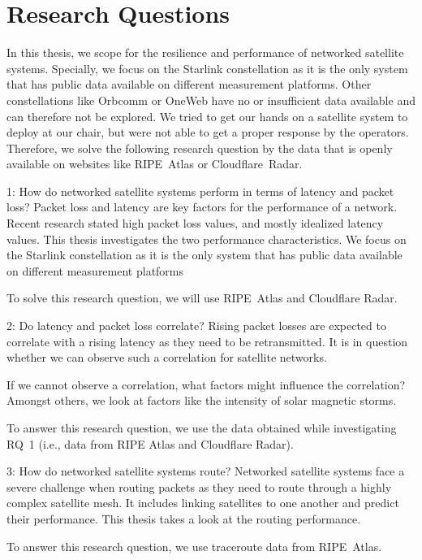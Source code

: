 \section{Research Questions} \label{sec:research-questions}

In this thesis, we scope for the resilience and performance of networked
satellite systems. Specially, we focus on the Starlink constellation as it is
the only system that has public data available on different measurement
platforms. Other constellations like Orbcomm or OneWeb have no or insufficient
data available and can therefore not be explored. We tried to get our
hands on a satellite system to deploy at our chair, but were not able to get a
proper response by the operators. Therefore, we solve the following research
question by the data that is openly available on websites like RIPE~Atlas or
Cloudflare~Radar.

\begin{rqbox}{1: How do networked satellite systems perform in terms of latency
		and packet loss?}
	Packet loss and latency are key factors for the performance of a
	network. Recent research stated high packet loss values, and mostly
	idealized latency values. This thesis investigates the two
	performance characteristics. We focus on the Starlink constellation as
	it is the only system that has public data available on different
	measurement platforms

	To solve this research question, we will use RIPE~Atlas and Cloudflare
	Radar.
\end{rqbox}

\begin{rqbox}{2: Do latency and packet loss correlate?}
	Rising packet losses are expected to correlate with a rising latency as
	they need to be retransmitted. It is in question whether we can observe
	such a correlation for satellite networks.

	If we cannot observe a correlation, what factors might influence the
	correlation? Amongst others, we look at factors like the intensity of
	solar magnetic storms.

	To answer this research question, we use the data obtained while
	investigating RQ~1 (i.e., data from RIPE Atlas and Cloudflare Radar).
\end{rqbox}

\begin{rqbox}{3: How do networked satellite systems route?}
	Networked satellite systems face a severe challenge when routing
	packets as they need to route through a highly complex satellite mesh.
	It includes linking satellites to one another and predict their
	performance. This thesis takes a look at the routing performance.

	To answer this research question, we use traceroute data from
	RIPE~Atlas.
\end{rqbox}
